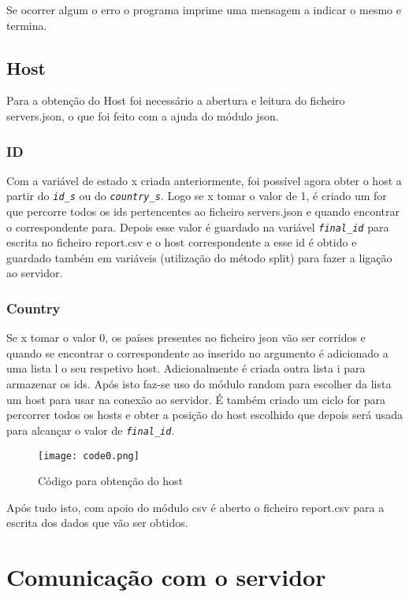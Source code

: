 \documentclass{report}
\begin{document}
Se ocorrer algum o erro o programa imprime uma mensagem a indicar o mesmo e termina.

\subsection{Host}

Para a obtenção do Host foi necessário a abertura e leitura do ficheiro servers.json, o que foi feito com a ajuda do módulo json.


\subsubsection{ID}
Com a variável de estado x criada anteriormente, foi possível agora obter o host a partir do {\itshape \texttt{id\_s}} ou do {\itshape \texttt{country\_s}}. 
Logo se x tomar o valor de 1, é criado um for que percorre todos os ids pertencentes ao ficheiro servers.json e quando encontrar o correspondente para. Depois esse valor é guardado na variável {\itshape \texttt{final\_id}} para escrita no ficheiro report.csv e o host correspondente a esse id é obtido e guardado também em variáveis (utilização do método split) para fazer a ligação ao servidor. 

\subsubsection{Country}
Se x tomar o valor 0, os países presentes no ficheiro json vão ser corridos e quando se encontrar o correspondente ao inserido no argumento é adicionado a uma lista l o seu respetivo host. Adicionalmente é criada outra lista i para armazenar os ids. 
Após isto faz-se uso do módulo random para escolher da lista um host para usar na conexão ao servidor. É também criado um ciclo for para percorrer todos os hosts e obter a posição do host escolhido que depois será usada para alcançar o valor de {\itshape \texttt{final\_id}}. 


\begin{figure}[h]
\center %
\texttt{[image: code0.png]}
\caption{Código para obtenção do host}
\label{fig:code0}
\end{figure}


Após tudo isto, com apoio do módulo csv é aberto o ficheiro report.csv para a escrita dos dados que vão ser obtidos.



\section{Comunicação com o servidor}
\end{document}
